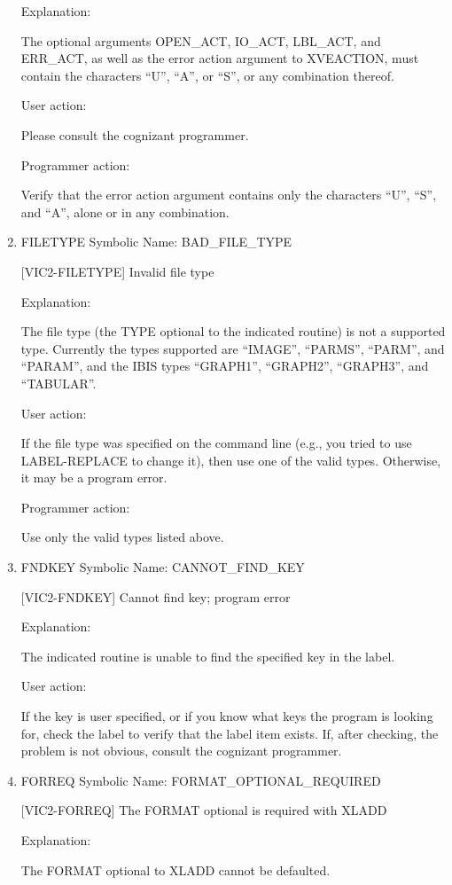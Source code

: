 \begin{enumerate}
Explanation:

The optional arguments OPEN\_ACT, IO\_ACT, LBL\_ACT, and ERR\_ACT,
as well as the error action argument to XVEACTION, must contain
the characters ``U'', ``A'', or ``S'', or any combination thereof.

User action:

Please consult the cognizant programmer.

Programmer action:

Verify that the error action argument contains only the characters
``U'', ``S'', and ``A'', alone or in any combination.


\item FILETYPE Symbolic Name: BAD\_FILE\_TYPE

[VIC2-FILETYPE] Invalid file type

Explanation:

The file type (the TYPE optional to the indicated routine) is not
a supported type.  Currently the types supported are ``IMAGE'',
``PARMS'', ``PARM'', and ``PARAM'', and the IBIS types ``GRAPH1'',
``GRAPH2'', ``GRAPH3'', and ``TABULAR''.

User action:

If the file type was specified on the command line (e.g., you tried
to use LABEL-REPLACE to change it), then use one of the valid types.
Otherwise, it may be a program error.

Programmer action:

Use only the valid types listed above.


\item FNDKEY Symbolic Name: CANNOT\_FIND\_KEY

[VIC2-FNDKEY] Cannot find key; program error

Explanation:

The indicated routine is unable to find the specified key
in the label.

User action:

If the key is user specified, or if you know what keys the
program is looking for, check the label to verify that the
label item exists.  If, after checking, the problem is not
obvious, consult the cognizant programmer.


\item FORREQ Symbolic Name: FORMAT\_OPTIONAL\_REQUIRED

[VIC2-FORREQ] The FORMAT optional is required with XLADD

Explanation:

The FORMAT optional to XLADD cannot be defaulted.


\end{enumerate}

